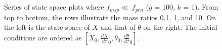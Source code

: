 \documentclass[12pt]{article}
\begin{document}
\begin{figure}
    \centering
     \\
     \\
    \caption{\small{Series of state space plots where $f_{msp} \ll \ f_{pen}$ ($g$ = 100, $k$ = 1). From top to bottom, the rows illustrate the mass ratios 0.1, 1, and 10. On the left is the state space of $X$ and that of $\theta$ on the right. The initial conditions are ordered as $[X_0, \frac{dX}{d\tau}_0, \theta_0, \frac{d\theta}{d\tau}_0]$.}}
    \label{fig:pendulum-mode}
\end{figure}
\end{document}
